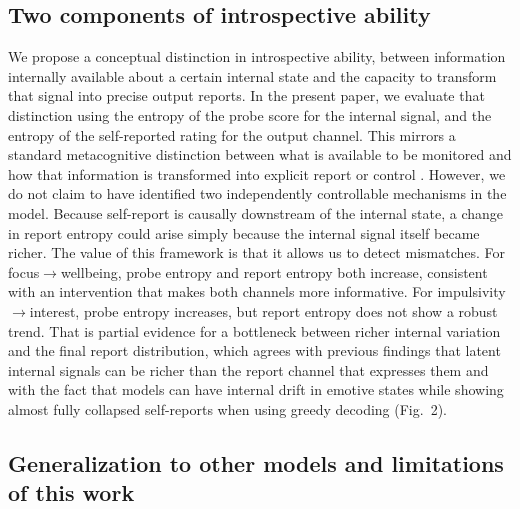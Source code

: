 \documentclass[10pt]{article}
\begin{document}
\subsection{Two components of introspective ability}

We propose a conceptual distinction in introspective ability, between information internally available about a certain internal state and the capacity to transform that signal into precise output reports. In the present paper, we evaluate that distinction using the entropy of the probe score for the internal signal, and the entropy of the self-reported rating for the output channel. This mirrors a standard metacognitive distinction between what is available to be monitored and how that information is transformed into explicit report or control \citep{BoldtGilbert2022, Fleming2024}.
However, we do not claim to have identified two independently controllable mechanisms in the model.
Because self-report is causally downstream of the internal state, a change in report entropy could arise simply because the internal signal itself became richer.
The value of this framework is that it allows us to detect mismatches.
For focus$\to$wellbeing, probe entropy and report entropy both increase, consistent with an intervention that makes both channels more informative.
For impulsivity$\to$interest, probe entropy increases, but report entropy does not show a robust trend.
That is partial evidence for a bottleneck between richer internal variation and the final report distribution, which agrees with previous findings that latent internal signals can be richer than the report channel that expresses them \citep{Xiong2024, Kumar2024, Yona2024, PearsonVogel2026} and with the fact that models can have internal drift in emotive states while showing almost fully collapsed self-reports when using greedy decoding (Fig.~2).

\subsection{Generalization to other models and limitations of this work}
\end{document}
